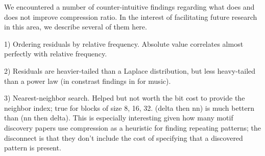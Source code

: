 We encountered a number of counter-intuitive findings regarding what does and does not improve compression ratio. In the interest of facilitating future research in this area, we describe several of them here.

1) Ordering residuals by relative frequency. Absolute value correlates almost perfectly with relative frequency. %

2) Residuals are heavier-tailed than a Laplace distribution, but less heavy-tailed than a power law (in constrast findings in \cite{shorten} for music).

3) Nearest-neighbor search. Helped but not worth the bit cost to provide the neighbor index; true for blocks of size 8, 16, 32. (delta then nn) is much bettern than (nn then delta). This is especially interesting given how many motif discovery papers use compression as a heuristic for finding repeating patterns; the disconnect is that they don't include the cost of specifying that a discovered pattern is present.


